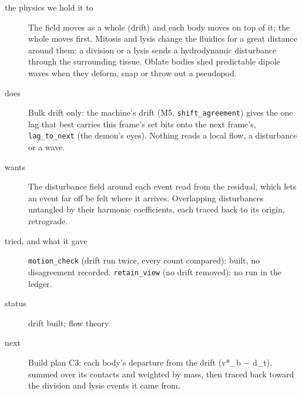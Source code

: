 \begin{description}
\item[{the physics we hold it to}] The field moves as a whole (drift) and each body moves on top of it; the whole moves first. Mitosis and lysis change the fluidics for a great distance around them: a division or a lysis sends a hydrodynamic disturbance through the surrounding tissue. Oblate bodies shed predictable dipole waves when they deform, snap or throw out a pseudopod.
\item[{does}] Bulk drift only: the machine's drift (M5, \texttt{shift\_\allowbreak{}agreement}) gives the one lag that best carries this frame's set bits onto the next frame's, \texttt{lag\_\allowbreak{}to\_\allowbreak{}next} (the demon's eyes). Nothing reads a local flow, a disturbance or a wave.
\item[{wants}] The disturbance field around each event read from the residual, which lets an event far off be felt where it arrives. Overlapping disturbances untangled by their harmonic coefficients, each traced back to its origin, retrograde.
\item[{tried, and what it gave}] \texttt{motion\_\allowbreak{}check} (drift run twice, every count compared): built, no disagreement recorded. \texttt{retain\_\allowbreak{}view} (no drift removed): no run in the ledger.
\item[{status}] drift built; flow theory
\item[{next}] Build plan C3: each body's departure from the drift (v*\_\allowbreak{}b − d\_\allowbreak{}t), summed over its contacts and weighted by mass, then traced back toward the division and lysis events it came from.
\end{description}

